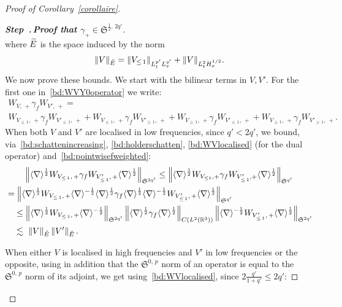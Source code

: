 \documentclass[AHL, Unicode, longabstracts,published]{cedram}
\newcommand{\R}{\mathbb{R}}
\newcommand{\frkS}{\mathfrak{S}}
\newcounter{stepcount}
\newenvironment{step}[1]{\refstepcounter{stepcount}\begin{proof}[{\bf{Step~\thestepcount}{.\,\emph{#1}}}]}{\let\qed\relax\end{proof}}
\let\oldtilde\tilde
\renewcommand*{\tilde}[1]{\mathchoice{\widetilde{#1}}{\widetilde{#1}}{\oldtilde{#1}}{\oldtilde{#1}}}
\begin{document}
\begin{proof}[Proof of Corollary~\ref{corollaire}]
\begin{step}{{Proof that $\gamma_+\in \frkS^{\frac 12,\,2q'}$}}
\begin{equation}
\end{equation}
where $\tilde E$ is the space induced by the norm
\[
\|V\|_{\tilde E} = \left\|V_{\leq\,1}\right\|_{L^{p'}_tL^{q'}_x} + \|V\|_{L^2_tH^{1/2}_x}.
\]
We now prove these bounds. We start with the bilinear terms in $V,V'$. For the first one in~\eqref{bd:WVY0operator} we write:
\begin{multline*}
W_{V,\,+}\gamma_f W_{V',\,+} = \\
W_{V_{\leq\,1},\,+}\gamma_f W_{V'_{\leq\,1},\,+}+W_{V_{\leq\,1},\,+}\gamma_f W_{V'_{\geq\,1},\,+}+W_{V_{\geq\,1},\,+}\gamma_f W_{V'_{\leq\,1},\,+}+W_{V_{\geq\,1},\,+}\gamma_f W_{V'_{\geq\,1},\,+}.
\end{multline*}
When both $V$ and $V'$ are localised in low frequencies, since $q'<2q'$, we bound, via~\eqref{bd:schattenincreasing}, \eqref{bd:holderschatten}, \eqref{bd:WVlocalised} (for the dual operator) and~\eqref{bd:pointwisefweighted}:
\begin{multline*}
\left\| \langle \nabla \rangle^{\frac 12} W_{V_{\leq\, 1},\,+}\gamma_f W_{V'_{\leq\,1},\,+}\langle \nabla \rangle^{\frac 12} \right\|_{\frkS^{2q'}} \leq \left\| \langle \nabla \rangle^{\frac 12} W_{V_{\leq 1},+}\gamma_f W_{V'_{\leq\,1},+}\langle \nabla \rangle^{\frac 12}\right\|_{\frkS^{q'}} \\
\begin{aligned}
&=\left\| \langle \nabla \rangle^{\frac 12} W_{V_{\leq\,1},\,+}\langle \nabla \rangle^{-\frac 12}\langle \nabla \rangle^{\frac 12} \gamma_f\langle \nabla \rangle^{\frac 12} \langle \nabla \rangle^{-\frac 12} W_{V'_{\leq\,1},\,+}\langle \nabla \rangle^{\frac 12} \right\|_{\frkS^{q'}}\\
&\quad \leq \left\| \langle \nabla \rangle^{\frac 12} W_{V_{\leq\,1},\,+}\langle \nabla \rangle^{-\frac 12}\right\|_{\frkS^{2q'}} \left\|\langle \nabla \rangle^{\frac 12} \gamma_f\langle \nabla \rangle^{\frac 12}\right\|_{C\left(L^2\left(\R^3\right)\right)} \left\| \langle \nabla \rangle^{-\frac 12} W_{V'_{\leq\,1},\,+}\langle \nabla \rangle^{\frac 12} \right\|_{\frkS^{2q'}} \\
&\quad \lesssim \ \| V\|_{\tilde E}\left\| V'\right\|_{\tilde E}.
\end{aligned}
\end{multline*}

When either $V$ is localised in high frequencies and $V'$ in low frequencies or the opposite, using in addition that the $\frkS^{0,\,p}$ norm of an operator is equal to the $\frkS^{0,\,p}$ norm of its adjoint, we get using~\eqref{bd:WVlocalised}, since $2 \frac{q'}{1+q'} \leq 2q'$:


\end{step}
\end{proof}
\end{document}
